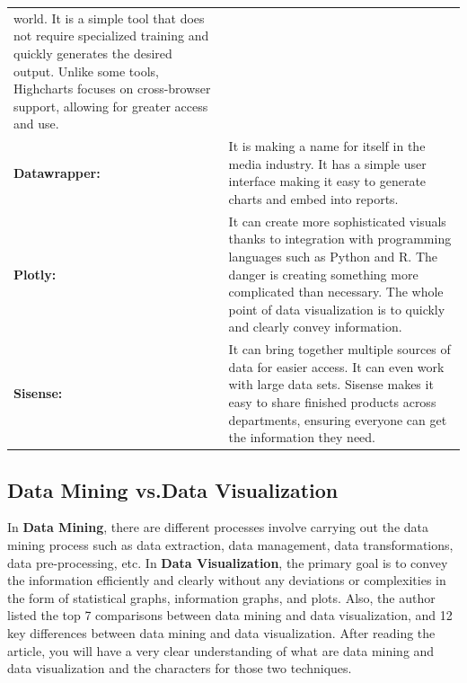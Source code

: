 \documentclass[]{book}
\theoremstyle{definition}
\theoremstyle{definition}
\theoremstyle{definition}
\theoremstyle{remark}
\begin{document}
\begin{longtable}[]{@{}ll@{}}
\begin{minipage}[t]{0.78\columnwidth}
world. It is a simple tool that does not require specialized training
and quickly generates the desired output. Unlike some tools, Highcharts
focuses on cross-browser support, allowing for greater access and
use.\strut
\end{minipage}\tabularnewline
\begin{minipage}[t]{0.16\columnwidth}\raggedright\strut
\textbf{Datawrapper:}\strut
\end{minipage} & \begin{minipage}[t]{0.78\columnwidth}\raggedright\strut
It is making a name for itself in the media industry. It has a simple
user interface making it easy to generate charts and embed into
reports.\strut
\end{minipage}\tabularnewline
\begin{minipage}[t]{0.16\columnwidth}\raggedright\strut
\textbf{Plotly:}\strut
\end{minipage} & \begin{minipage}[t]{0.78\columnwidth}\raggedright\strut
It can create more sophisticated visuals thanks to integration with
programming languages such as Python and R. The danger is creating
something more complicated than necessary. The whole point of data
visualization is to quickly and clearly convey information.\strut
\end{minipage}\tabularnewline
\begin{minipage}[t]{0.16\columnwidth}\raggedright\strut
\textbf{Sisense:}\strut
\end{minipage} & \begin{minipage}[t]{0.78\columnwidth}\raggedright\strut
It can bring together multiple sources of data for easier access. It can
even work with large data sets. Sisense makes it easy to share finished
products across departments, ensuring everyone can get the information
they need.\strut
\end{minipage}\tabularnewline
\bottomrule
\end{longtable}

\subsection{Data Mining vs.Data
Visualization}\label{data-mining-vs.data-visualization}

In \textbf{Data Mining}, there are different processes involve carrying
out the data mining process such as data extraction, data management,
data transformations, data pre-processing, etc. In \textbf{Data
Visualization}, the primary goal is to convey the information
efficiently and clearly without any deviations or complexities in the
form of statistical graphs, information graphs, and plots. Also, the
author listed the top 7 comparisons between data mining and data
visualization, and 12 key differences between data mining and data
visualization. After reading the article, you will have a very clear
understanding of what are data mining and data visualization and the
characters for those two techniques.
\end{document}
